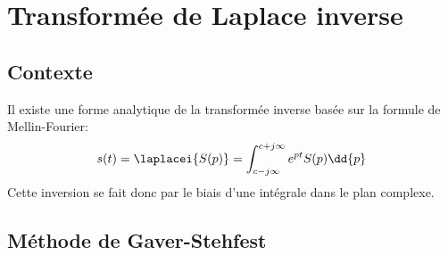 \chapter{Transformée de Laplace inverse~\label{annexe-invL}}

\section{Contexte}

Il existe une forme analytique de la transformée inverse basée sur
la formule de Mellin-Fourier\cite{Ostertag}:
\[
s(t)=\laplacei{S(p)}=\int_{c-j\infty}^{c+j\infty} e^{pt}S(p)\dd{p}
\]
Cette inversion se fait donc par le biais d'une intégrale dans le plan
complexe.
\section{Méthode de Gaver-Stehfest}

